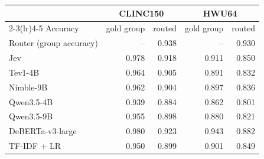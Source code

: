 \begin{tabular}{lrrrr}
\toprule
 & \multicolumn{2}{c}{CLINC150} & \multicolumn{2}{c}{HWU64} \\
\cmidrule(lr){2-3}\cmidrule(lr){4-5}
Accuracy & gold group & routed & gold group & routed \\
\midrule
Router (group accuracy) & -- & 0.938 & -- & 0.930 \\
\midrule
Jev & 0.978 & 0.918 & 0.911 & 0.850 \\
Tev1-4B & 0.964 & 0.905 & 0.891 & 0.832 \\
Nimble-9B & 0.962 & 0.904 & 0.897 & 0.836 \\
Qwen3.5-4B & 0.939 & 0.884 & 0.862 & 0.801 \\
Qwen3.5-9B & 0.955 & 0.898 & 0.880 & 0.821 \\
DeBERTa-v3-large & 0.980 & 0.923 & 0.943 & 0.882 \\
TF-IDF + LR & 0.950 & 0.899 & 0.901 & 0.849 \\
\bottomrule
\end{tabular}
